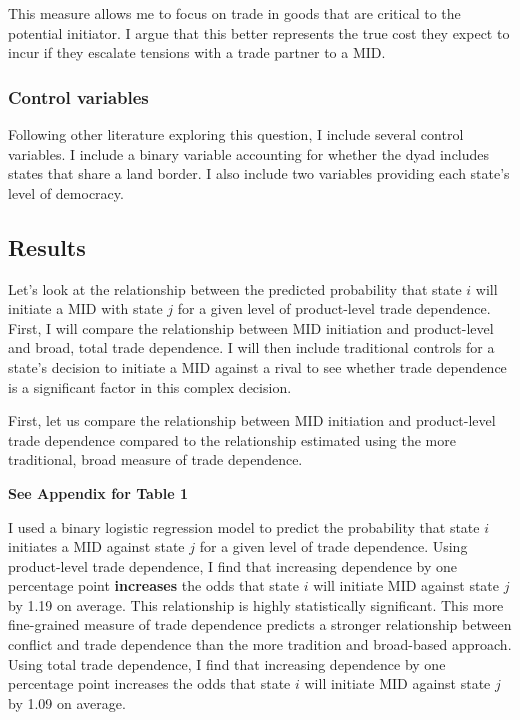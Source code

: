 \documentclass[
  letterpaper,
]{article}
\begin{document}
This measure allows me to focus on trade in goods that are critical to
the potential initiator. I argue that this better represents the true
cost they expect to incur if they escalate tensions with a trade partner
to a MID.

\hypertarget{control-variables}{%
\subsubsection{Control variables}\label{control-variables}}

Following other literature exploring this question, I include several
control variables. I include a binary variable accounting for whether
the dyad includes states that share a land border. I also include two
variables providing each state's level of democracy.

\hypertarget{results}{%
\subsection{Results}\label{results}}

Let's look at the relationship between the predicted probability that
state \(i\) will initiate a MID with state \(j\) for a given level of
product-level trade dependence. First, I will compare the relationship
between MID initiation and product-level and broad, total trade
dependence. I will then include traditional controls for a state's
decision to initiate a MID against a rival to see whether trade
dependence is a significant factor in this complex decision.

First, let us compare the relationship between MID initiation and
product-level trade dependence compared to the relationship estimated
using the more traditional, broad measure of trade dependence.

\textbf{See Appendix for Table 1}

I used a binary logistic regression model to predict the probability
that state \(i\) initiates a MID against state \(j\) for a given level
of trade dependence. Using product-level trade dependence, I find that
increasing dependence by one percentage point \textbf{increases} the
odds that state \(i\) will initiate MID against state \(j\) by 1.19 on
average. This relationship is highly statistically significant. This
more fine-grained measure of trade dependence predicts a stronger
relationship between conflict and trade dependence than the more
tradition and broad-based approach. Using total trade dependence, I find
that increasing dependence by one percentage point increases the odds
that state \(i\) will initiate MID against state \(j\) by 1.09 on
average.
\end{document}

